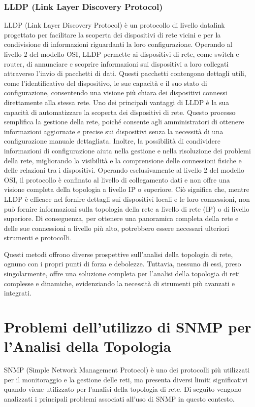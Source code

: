 \documentclass[target=bach,aauheader=,style=]{thud}
\begin{document}
\subsubsection{LLDP (Link Layer Discovery Protocol)}
LLDP (Link Layer Discovery Protocol) \cite{ieee_lldp} è un protocollo di livello datalink progettato per facilitare la scoperta dei dispositivi di rete vicini e per la condivisione di informazioni riguardanti la loro configurazione. Operando al livello 2 del modello OSI, LLDP permette ai dispositivi di rete, come switch e router, di annunciare e scoprire informazioni sui dispositivi a loro collegati attraverso l'invio di pacchetti di dati. Questi pacchetti contengono dettagli utili, come l'identificativo del dispositivo, le sue capacità e il suo stato di configurazione, consentendo una visione più chiara dei dispositivi connessi direttamente alla stessa rete.
\newline
Uno dei principali vantaggi di LLDP è la sua capacità di automatizzare la scoperta dei dispositivi di rete. Questo processo semplifica la gestione della rete, poiché consente agli amministratori di ottenere informazioni aggiornate e precise sui dispositivi senza la necessità di una configurazione manuale dettagliata. Inoltre, la possibilità di condividere informazioni di configurazione aiuta nella gestione e nella risoluzione dei problemi della rete, migliorando la visibilità e la comprensione delle connessioni fisiche e delle relazioni tra i dispositivi.
\newline
Operando esclusivamente al livello 2 del modello OSI, il protocollo è confinato al livello di collegamento dati e non offre una visione completa della topologia a livello IP o superiore. Ciò significa che, mentre LLDP è efficace nel fornire dettagli sui dispositivi locali e le loro connessioni, non può fornire informazioni sulla topologia della rete a livello di rete (IP) o di livello superiore. Di conseguenza, per ottenere una panoramica completa della rete e delle sue connessioni a livello più alto, potrebbero essere necessari ulteriori strumenti e protocolli.

\noindent Questi metodi offrono diverse prospettive sull'analisi della topologia di rete, ognuno con i propri punti di forza e debolezze. Tuttavia, nessuno di essi, preso singolarmente, offre una soluzione completa per l'analisi della topologia di reti complesse e dinamiche, evidenziando la necessità di strumenti più avanzati e integrati.

\section{Problemi dell'utilizzo di SNMP per l'Analisi della Topologia}
SNMP (Simple Network Management Protocol) è uno dei protocolli più utilizzati per il monitoraggio e la gestione delle reti, ma presenta diversi limiti significativi quando viene utilizzato per l'analisi della topologia di rete. Di seguito vengono analizzati i principali problemi associati all'uso di SNMP in questo contesto.
\end{document}
